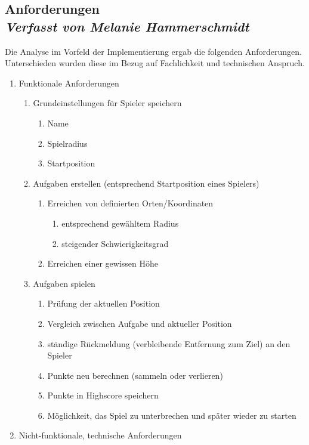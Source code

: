 \subsection[Anforderungen]{Anforderungen
 \\ \textnormal{\small{\textit {Verfasst von Melanie Hammerschmidt}}}}

Die Analyse im Vorfeld der Implementierung ergab die folgenden Anforderungen. Unterschieden wurden diese im Bezug auf Fachlichkeit und technischen Anspruch.
\begin{enumerate}
\item Funktionale Anforderungen
	\begin{enumerate}
		\item Grundeinstellungen für Spieler speichern
		\begin{enumerate}
			\item Name
			\item Spielradius		
			\item Startposition
		\end{enumerate}
		\item Aufgaben erstellen (entsprechend Startposition eines Spielers)
		\begin{enumerate}
			\item Erreichen von definierten Orten/Koordinaten
			\begin{enumerate}
				\item entsprechend gewähltem Radius
				\item steigender Schwierigkeitsgrad
			\end{enumerate}
			\item Erreichen einer gewissen Höhe
		\end{enumerate}
		\item Aufgaben spielen
		\begin{enumerate}
			\item Prüfung der aktuellen Position 
			\item Vergleich zwischen Aufgabe und aktueller Position
			\item ständige Rückmeldung (verbleibende Entfernung zum Ziel) an den Spieler
			\item Punkte neu berechnen (sammeln oder verlieren)
			\item Punkte in Highscore speichern
			\item Möglichkeit, das Spiel zu unterbrechen und später wieder zu starten
		\end{enumerate}
	\end{enumerate}
	\item Nicht-funktionale, technische Anforderungen

\end{enumerate}
